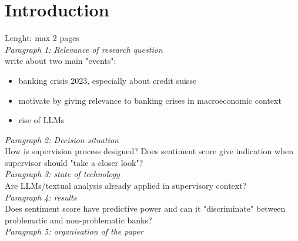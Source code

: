 \chapter{Introduction}\label{sec1}
\thispagestyle{empty}

Lenght: max 2 pages \\

\noindent
\textit{Paragraph 1: Relevance of research question} \\
\noindent
write about two main "events":

\begin{itemize}
	\item banking crisis 2023, especially about credit suisse
	\item motivate by giving relevance to banking crises in macroeconomic context
	\item rise of LLMs 
\end{itemize}

\noindent
\textit{Paragraph 2: Decision situation} \\
\noindent
How is supervision process designed? Does sentiment score give indication when supervisor should "take a closer look"? \\

\noindent
\textit{Paragraph 3: state of technology} \\
\noindent
Are LLMs/textual analysis already applied in supervisory context? \\

\noindent
\textit{Paragraph 4: results} \\
Does sentiment score have predictive power and can it "discriminate" between problematic and non-problematic banks? \\

\noindent
\textit{Paragraph 5: organisation of the paper}



\cleardoublepage

